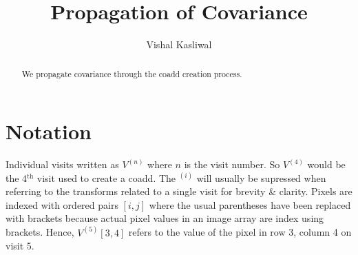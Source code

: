 \documentclass[times]{aastex6}
\begin{document}
\title{Propagation of Covariance}

\author {Vishal Kasliwal}



\begin{abstract}
We propagate covariance through the coadd creation process.
\end{abstract}

\section{Notation}
Individual visits written as $V^{(n)}$ where $n$ is the visit number. So $V^{(4)}$ would be the 4$^{\mathrm{th}}$ visit used to create a coadd. The $^{(i)}$ will usually be supressed when referring to the transforms related to a single visit for brevity \& clarity. Pixels are indexed with ordered pairs $[i,j]$ where the usual parentheses have been replaced with brackets because actual pixel values in an image array are index using brackets. Hence, $V^{(5)}[3,4]$ refers to the value of the pixel in row 3, column 4 on visit 5.
\end{document}
